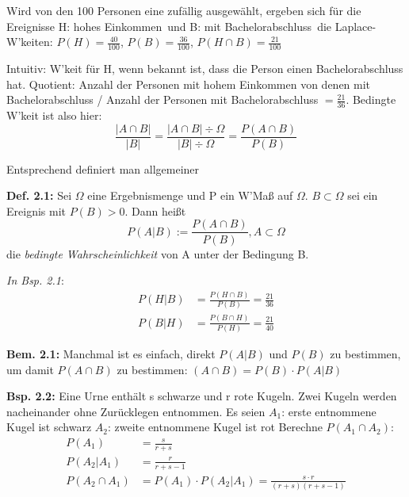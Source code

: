 \documentclass[a4paper,11pt]{article}
\begin{document}
\noindent Wird von den 100 Personen eine zufällig ausgewählt, ergeben sich für die Ereignisse 
H: \glqq hohes Einkommen\grqq\ und B: \glqq mit Bachelorabschluss\grqq\ die Laplace-W'keiten:
\newline $P(H)=\frac{40}{100}$, $P(B)=\frac{36}{100}$, $P(H\cap B)=\frac{21}{100}$

\vspace{4pt}
\noindent Intuitiv: W'keit für H, wenn bekannt ist, dass die Person einen Bachelorabschluss hat.
\newline Quotient: Anzahl der Personen mit hohem Einkommen von denen mit Bachelorabschluss / Anzahl der Personen mit Bachelorabschluss $=\frac{21}{36}$. Bedingte W'keit ist also hier:
\[\frac{|A\cap B|}{|B|}=\frac{|A\cap B|\div\Omega}{|B|\div\Omega}=\frac{P(A\cap B)}{P(B)}\]

\vspace{6pt}
\noindent Entsprechend definiert man allgemeiner

\vspace{6pt}
\noindent\textbf{Def. 2.1:} Sei $\Omega$ eine Ergebnismenge und P ein W'Maß auf $\Omega$. $B\subset\Omega$ sei ein Ereignis mit $P(B)>0$. Dann heißt 
\[P(A|B):=\frac{P(A\cap B)}{P(B)}, A\subset\Omega\]
die \textit{bedingte Wahrscheinlichkeit} von A unter der Bedingung B.

\vspace{6pt}
\noindent\textit{In Bsp. 2.1}:
\begin{align*}
P(H|B) &=\frac{P(H\cap B)}{P(B)}=\frac{21}{36}\\
P(B|H) &=\frac{P(B\cap H)}{P(H)}=\frac{21}{40}
\end{align*}

\vspace{6pt}
\noindent\textbf{Bem. 2.1:} Manchmal ist es einfach, direkt $P(A|B)$ und $P(B)$ zu bestimmen, um damit $P(A\cap B)$ zu bestimmen: $(A\cap B)=P(B) \cdot P(A|B)$

\vspace{6pt}
\noindent\textbf{Bsp. 2.2:} Eine Urne enthält s schwarze und r rote Kugeln. 
Zwei Kugeln werden nacheinander ohne Zurücklegen entnommen. Es seien
\newline $A_1$: \glqq erste entnommene Kugel ist schwarz\grqq
\newline $A_2$: \glqq zweite entnommene Kugel ist rot\grqq
\newline Berechne $P(A_1\cap A_2)$:
\begin{align*}
P(A_1)&=\frac{s}{r+s}\\
P(A_2|A_1)&=\frac{r}{r+s-1}\\
P(A_2\cap A_1)&= P(A_1)\cdot P(A_2|A_1)=\frac{s\cdot r}{(r+s)(r+s-1)}
\end{align*}
\end{document}

